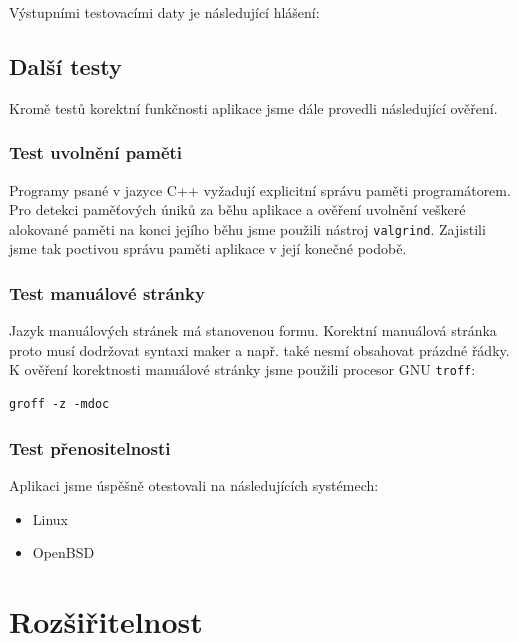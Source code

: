 \documentclass[thesis=B,czech,hidelinks]{thesis}[2012/06/26]
\begin{document}
Výstupními testovacími daty je následující hlášení:



\section{Další testy}

Kromě testů korektní funkčnosti aplikace jsme dále provedli následující ověření.

\subsection{Test uvolnění paměti}

Programy psané v jazyce C++ vyžadují explicitní správu paměti programátorem. Pro detekci paměťových úniků za běhu aplikace a ověření uvolnění veškeré alokované paměti na konci jejího běhu jsme použili nástroj \texttt{valgrind}. Zajistili jsme tak poctivou správu paměti aplikace v její konečné podobě.

\subsection{Test manuálové stránky}

Jazyk manuálových stránek má stanovenou formu. Korektní manuálová stránka proto musí dodržovat syntaxi maker a např. také nesmí obsahovat prázdné řádky. K ověření korektnosti manuálové stránky jsme použili procesor GNU \texttt{troff}:

\begin{lstlisting}
groff -z -mdoc
\end{lstlisting}

\subsection{Test přenositelnosti}

Aplikaci jsme úspěšně otestovali na následujících systémech:

\begin{itemize}
	\item Linux
	\item OpenBSD
\end{itemize}

%
%
%

\chapter{Rozšiřitelnost}
\end{document}
